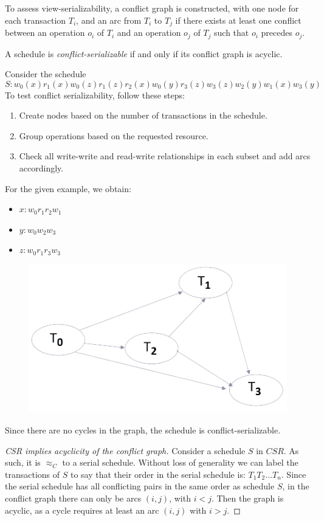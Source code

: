 To assess view-serializability, a conflict graph is constructed, with one node for each transaction $T_i$, and an arc from $T_i$ to $T_j$ if there exists at least one conflict between an operation $o_i$ of $T_i$ and an operation $o_j$ of $T_j$ such that $o_i$ precedes $o_j$.
\begin{theorem}
    A schedule is \emph{conflict-serializable} if and only if its conflict graph is acyclic.
\end{theorem}
\begin{example}
    Consider the schedule 
    \[S: w_0(x) r_1(x) w_0(z) r_1(z) r_2(x) w_0(y) r_3(z) w_3(z) w_2(y) w_1(x) w_3(y)\]
    To test conflict serializability, follow these steps:
    \begin{enumerate}
        \item Create nodes based on the number of transactions in the schedule.
        \item Group operations based on the requested resource.
        \item Check all write-write and read-write relationships in each subset and add arcs accordingly. 
    \end{enumerate}
    For the given example, we obtain:
    \begin{itemize}
        \item $x: w_0 r_1 r_2 w_1$
        \item $y: w_0 w_2 w_3$
        \item $z: w_0 r_1 r_3 w_3$
    \end{itemize}
    \begin{figure}[H]
        \centering
        \includegraphics[width=0.5\linewidth]{images/conflict.png}
    \end{figure}
    Since there are no cycles in the graph, the schedule is conflict-serializable.
\end{example}
\begin{proof}[CSR implies acyclicity of the conflict graph]
    Consider a schedule $S$ in $CSR$. 
    As such, it is $\approx_C$ to a serial schedule. 
    Without loss of generality we can label the transactions of $S$ to say that their order in the serial schedule is: $T_1 T_2 \dots T_n$.
    Since the serial schedule has all conflicting pairs in the same order as schedule $S$, in the conflict graph there can only be arcs $(i,j)$, with $i<j$. 
    Then the graph is acyclic, as a cycle requires at least an arc $(i,j)$ with $i>j$.
\end{proof}
